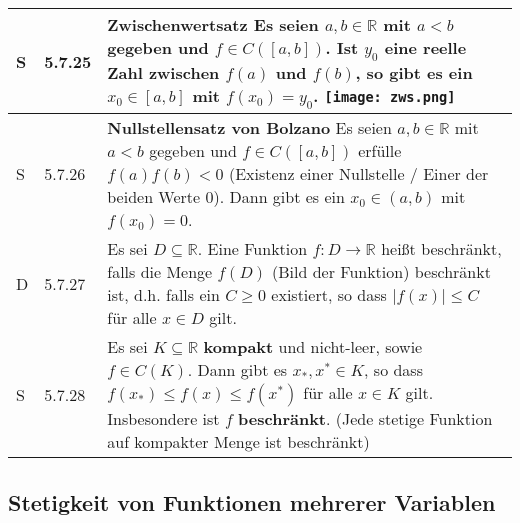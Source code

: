     \begin{longtable}{p{0.75cm} p{1cm} p{16cm}}
        \toprule
        S   & 5.7.25&   \textbf{Zwischenwertsatz} \hfill \break
                        Es seien $a,b \in \mathbb{R}$ mit $a < b$ gegeben und $f \in C([a,b])$. Ist $y_0$ eine reelle Zahl zwischen $f(a)$ und $f(b)$,
                        so gibt es ein $x_0 \in [a,b]$ mit $f(x_0) = y_0$. \hfill \break
                        \texttt{[image: zws.png]} \\
        \midrule
        S   & 5.7.26&   \textbf{Nullstellensatz von Bolzano} \hfill \break
                        Es seien $a,b \in \mathbb{R}$ mit $a < b$ gegeben und $f \in C([a,b])$ erfülle $f(a)f(b) < 0$ (Existenz einer Nullstelle /
                        Einer der beiden Werte 0).
                        Dann gibt es ein $x_0 \in (a,b)$ mit $f(x_0) = 0$. \\
        \midrule
        D   & 5.7.27&   Es sei $D \subseteq \mathbb{R}$. Eine Funktion $f: D \rightarrow \mathbb{R}$ hei\ss t beschränkt, falls die Menge
                        $f(D)$ (Bild der Funktion) beschränkt ist, d.h. falls ein $C \geq 0$ existiert, so dass $|f(x)| \leq C$ für alle $x \in D$ gilt. \\
        \midrule
        S   & 5.7.28&   Es sei $K \subseteq \mathbb{R}$ \textbf{kompakt} und nicht-leer, sowie $f \in C(K)$. Dann gibt es $x_*, x^* \in K$, so dass
                        $f(x_*) \leq f(x) \leq f(x^*)$ für alle $x \in K$ gilt. Insbesondere ist $f$ \textbf{beschränkt}. (Jede stetige Funktion auf 
                        kompakter Menge ist beschränkt)\\
        \bottomrule

    \end{longtable}


\subsection{Stetigkeit von Funktionen mehrerer Variablen}


